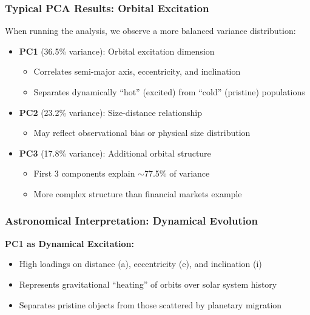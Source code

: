 \documentclass[aspectratio=169]{beamer}
\begin{document}
\begin{frame}
    \frametitle{Typical PCA Results: Orbital Excitation}
    When running the analysis, we observe a more balanced variance distribution:
    \begin{itemize}
        \item \textbf{PC1} (36.5\% variance): Orbital excitation dimension \pause
              \begin{itemize}
                  \item Correlates semi-major axis, eccentricity, and inclination \pause
                  \item Separates dynamically ``hot'' (excited) from ``cold'' (pristine) populations \pause
              \end{itemize}
        \item \textbf{PC2} (23.2\% variance): Size-distance relationship \pause
              \begin{itemize}
                  \item May reflect observational bias or physical size distribution \pause
              \end{itemize}
        \item \textbf{PC3} (17.8\% variance): Additional orbital structure \pause
              \begin{itemize}
                  \item First 3 components explain $\sim$77.5\% of variance \pause
                  \item More complex structure than financial markets example \pause
              \end{itemize}
    \end{itemize}
\end{frame}

\begin{frame}
    \frametitle{Astronomical Interpretation: Dynamical Evolution}
    \textbf{PC1 as Dynamical Excitation:}
    \begin{itemize}
        \item High loadings on distance (a), eccentricity (e), and inclination (i) \pause
        \item Represents gravitational ``heating'' of orbits over solar system history \pause
        \item Separates pristine objects from those scattered by planetary migration \pause
    \end{itemize}
\end{frame}
\end{document}
